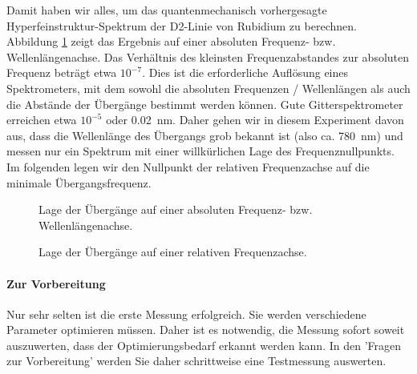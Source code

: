 Damit haben wir alles, um das quantenmechanisch vorhergesagte Hyperfeinstruktur-Spektrum der D2-Linie von Rubidium zu berechnen. Abbildung \ref{sim_spectra} zeigt das Ergebnis auf einer absoluten Frequenz- bzw. Wellenlängenachse. Das Verhältnis des kleinsten Frequenzabstandes zur absoluten Frequenz beträgt etwa $10^{-7}$. Dies ist die erforderliche Auflösung eines Spektrometers, mit dem sowohl die absoluten Frequenzen / Wellenlängen als auch die Abstände der Übergänge bestimmt werden können. Gute Gitterspektrometer erreichen etwa $10^{-5}$ oder 0.02~nm. Daher gehen wir in diesem Experiment davon aus, dass die Wellenlänge des Übergangs grob bekannt ist (also ca. 780~nm) und messen nur ein Spektrum mit einer willkürlichen Lage des Frequenznullpunkts. Im folgenden legen wir den Nullpunkt der relativen Frequenzachse auf die minimale Übergangsfrequenz.


\begin{figure}

 \vspace*{5mm}

	\caption{Lage der Übergänge auf einer absoluten Frequenz- bzw. Wellenlängenachse.}
	\label{sim_spectra}
\end{figure}




\begin{figure}

	\caption{Lage der Übergänge auf einer relativen Frequenzachse.}
	\label{sim_spectra_null}
\end{figure}


\paragraph*{Zur Vorbereitung}  Nur sehr selten ist die erste Messung erfolgreich. Sie werden verschiedene Parameter optimieren müssen. Daher ist es notwendig, die Messung sofort soweit auszuwerten, dass der Optimierungsbedarf erkannt werden kann.  In den 'Fragen zur Vorbereitung' werden Sie daher schrittweise eine Testmessung auswerten.

\begin{questions}
\end{questions}
	

